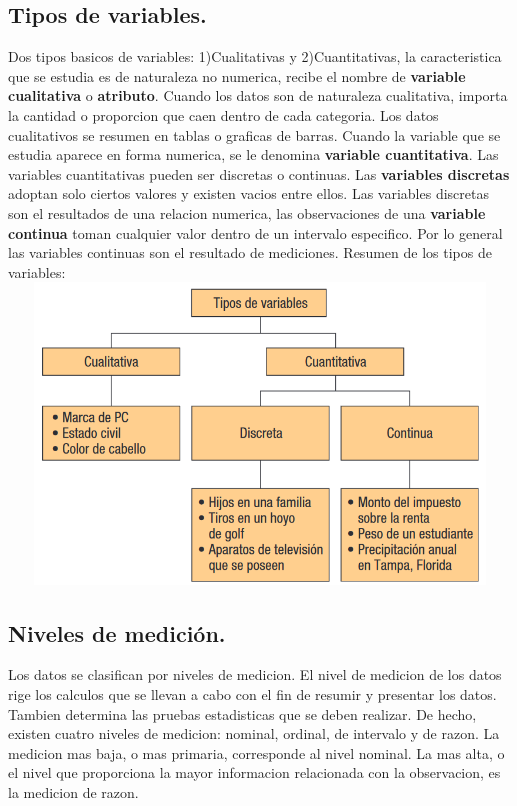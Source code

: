\documentclass[]{article}
\begin{document}
\subsection{Tipos de variables.}
Dos tipos basicos de variables: 1)Cualitativas y 2)Cuantitativas, la caracteristica que se estudia es de naturaleza no numerica, recibe el nombre de \textbf{variable cualitativa} o \textbf{atributo}. Cuando los datos son de naturaleza cualitativa, importa la cantidad o proporcion que caen dentro de cada categoria. Los datos cualitativos se resumen en tablas o graficas de barras. Cuando la variable que se estudia aparece en forma numerica, se le denomina \textbf{variable cuantitativa}. Las variables cuantitativas pueden ser discretas o continuas. Las \textbf{variables discretas} adoptan solo ciertos valores y existen vacios entre ellos. Las variables discretas son el resultados de una relacion numerica, las observaciones de una \textbf{variable continua} toman cualquier valor dentro de un intervalo especifico. Por lo general las variables continuas son el resultado de mediciones. \linebreak Resumen de los tipos de variables: \\
\includegraphics[width=14cm, height=8cm]{resumenTiposVariables1_2}

\subsection{Niveles de medición.}
Los datos se clasifican por niveles de medicion. El nivel de medicion de los datos rige los calculos que se llevan a cabo con el fin de resumir y presentar los datos. Tambien determina las pruebas estadisticas que se deben realizar. De hecho, existen cuatro niveles de medicion: nominal, ordinal, de intervalo y de razon. La medicion mas baja, o mas primaria, corresponde al nivel nominal. La mas alta, o el nivel que proporciona la mayor informacion relacionada con la observacion, es la medicion de razon.
\end{document}
